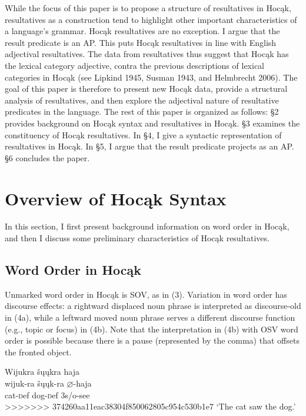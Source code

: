 \documentclass[output=paper]{LSP/langsci}
\begin{document}
While the focus of this paper is to propose a structure of resultatives in Hoc\k{a}k, resultatives as a construction tend to highlight other important characteristics of a language's grammar. Hoc\k{a}k resultatives are no exception. I argue that the result predicate is an AP. This puts Hoc\k{a}k resultatives in line with English adjectival resultatives. The data from resultatives
thus suggest that Hoc\k{a}k has the lexical category adjective, contra the previous descriptions of lexical categories in Hoc\k{a}k (see Lipkind 1945, Susman 1943, and Helmbrecht 2006). The goal of this paper is therefore to present new Hoc\k{a}k data, provide a structural analysis of resultatives, and then explore the adjectival nature of resultative predicates in the language. The rest of this paper is organized as follows: \S 2 provides background on Hoc\k{a}k syntax and resultatives in Hoc\k{a}k. \S 3 examines the constituency of Hoc\k{a}k resultatives. In \S 4, I give a syntactic representation of resultatives in Hoc\k{a}k. In \S 5, I argue that the result predicate projects as an AP. \S 6 concludes the paper.

\section{Overview of Hoc\k{a}k Syntax}

In this section, I first present background information on word order in Hoc\k{a}k, and then I discuss some preliminary characteristics of Hoc\k{a}k resultatives.

\subsection{Word Order in Hoc\k{a}k}

Unmarked word order in Hoc\k{a}k is SOV, as in (3). Variation in word order has discourse effects: a rightward displaced noun phrase is interpreted as discourse-old in (4a), while a leftward moved noun phrase serves a different discourse function (e.g., topic or focus) in (4b). Note that the interpretation in (4b) with OSV word order is possible because there is a pause (represented by the comma) that offsets the fronted object.

\begin{exe}

\ex \glll Wijukra \v{s}\k{u}\k{u}kra haja \\
 wijuk-ra \v{s}\k{u}\k{u}k-ra $\varnothing$-haja\\
cat-{\textsc def} dog-{\textsc def} {\textsc 3s/o}-see\\
>>>>>>> 374260aa11eac38304f850062805c954c530b1e7
\glt `The cat saw the dog.'

\end{exe}
\end{document}
